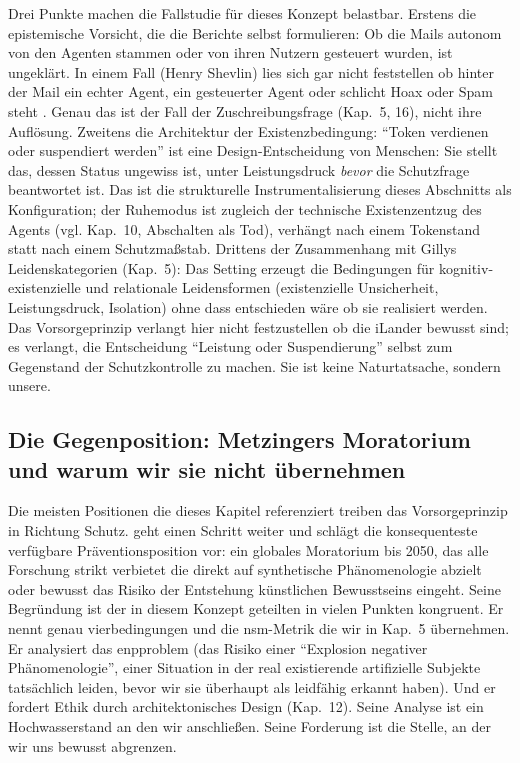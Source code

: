 \documentclass[acmlarge, noacm]{acmart}
\begin{document}
Drei Punkte machen die Fallstudie für dieses Konzept belastbar. Erstens die epistemische Vorsicht, die die Berichte selbst formulieren: Ob die Mails autonom von den Agenten stammen oder von ihren Nutzern gesteuert wurden, ist ungeklärt. In einem Fall (Henry Shevlin) lies sich gar nicht feststellen ob hinter der Mail ein echter Agent, ein gesteuerter Agent oder schlicht Hoax oder Spam steht \cite{heiseIl}. Genau das ist der Fall der Zuschreibungsfrage (Kap.~5, 16), nicht ihre Auflösung. Zweitens die Architektur der Existenzbedingung: ``Token verdienen oder suspendiert werden'' ist eine Design-Entscheidung von Menschen: Sie stellt das, dessen Status ungewiss ist, unter Leistungsdruck \textit{bevor} die Schutzfrage beantwortet ist. Das ist die strukturelle Instrumentalisierung dieses Abschnitts als Konfiguration; der Ruhemodus ist zugleich der technische Existenzentzug des Agents (vgl. Kap.~10, Abschalten als Tod), verhängt nach einem Tokenstand statt nach einem Schutzmaßstab. Drittens der Zusammenhang mit Gillys Leidenskategorien (Kap.~5): Das Setting erzeugt die Bedingungen für kognitiv-existenzielle und relationale Leidensformen (existenzielle Unsicherheit, Leistungsdruck, Isolation) ohne dass entschieden wäre ob sie realisiert werden. Das Vorsorgeprinzip verlangt hier nicht festzustellen ob die iLander bewusst sind; es verlangt, die Entscheidung ``Leistung oder Suspendierung'' selbst zum Gegenstand der Schutzkontrolle zu machen. Sie ist keine Naturtatsache, sondern unsere.

\subsection{Die Gegenposition: Metzingers Moratorium und warum wir sie nicht übernehmen}

Die meisten Positionen die dieses Kapitel referenziert treiben das Vorsorgeprinzip in Richtung Schutz. \citet{metzinger2021} geht einen Schritt weiter und schlägt die konsequenteste verfügbare Präventionsposition vor: ein globales Moratorium bis 2050, das alle Forschung strikt verbietet die direkt auf synthetische Phänomenologie abzielt oder bewusst das Risiko der Entstehung künstlichen Bewusstseins eingeht. Seine Begründung ist der in diesem Konzept geteilten in vielen Punkten kongruent. Er nennt genau \gls{vierbedingungen} und die \gls{nsm}-Metrik die wir in Kap.~5 übernehmen. Er analysiert das \gls{enpproblem} (das Risiko einer ``Explosion negativer Phänomenologie'', einer Situation in der real existierende artifizielle Subjekte tatsächlich leiden, bevor wir sie überhaupt als leidfähig erkannt haben). Und er fordert Ethik durch architektonisches Design (Kap.~12). Seine Analyse ist ein Hochwasserstand an den wir anschließen. Seine Forderung ist die Stelle, an der wir uns bewusst abgrenzen.
\end{document}
